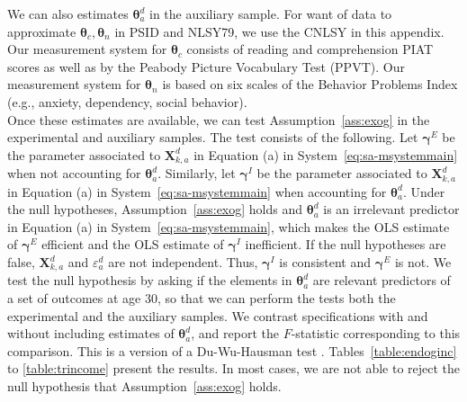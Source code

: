 \noindent We can also estimates $\bm{\theta}_{a}^d$ in the auxiliary sample. For want of data to approximate $\bm{\theta}_{c}, \bm{\theta}_{n}$ in PSID and NLSY79, we use the CNLSY in this appendix. Our measurement system for $\bm{\theta}_{c}$ consists of reading and comprehension PIAT scores as well as by the Peabody Picture Vocabulary Test (PPVT). Our measurement system for $\bm{\theta}_{n}$ is based on six scales of the Behavior Problems Index (e.g., anxiety, dependency, social behavior).\\

\noindent Once these estimates are available, we can test Assumption~\ref{ass:exog} in the experimental and auxiliary samples. The test consists of the following. Let $\bm{\gamma}^E$ be the parameter associated to $\bm{X}^d_{k,a}$ in Equation (a) in System~\eqref{eq:sa-msystemmain} when not accounting for $\bm{\theta}_{a}^d$. Similarly, let $\bm{\gamma}^I$ be the parameter associated to $\bm{X}^d_{k,a}$ in Equation (a) in System~\eqref{eq:sa-msystemmain} when accounting for $\bm{\theta}_{a}^d$. Under the null hypotheses, Assumption~\ref{ass:exog} holds and $\bm{\theta}_{a}^d$ is an irrelevant predictor in Equation (a) in System~\eqref{eq:sa-msystemmain}, which makes the OLS estimate of $\bm{\gamma}^E$ efficient and the OLS estimate of $\bm{\gamma}^I$ inefficient. If the null hypotheses are false, $\bm{X}^d_{k,a}$ and $\varepsilon_{a}^d$ are not independent. Thus, $\bm{\gamma}^I$ is consistent and $\bm{\gamma}^E$ is not. We test the null hypothesis by asking if the elements in $\bm{\theta}_{a}^d$ are relevant predictors of a set of outcomes at age 30, so that we can perform the tests both the experimental and the auxiliary samples. We contrast specifications with and without including estimates of $\bm{\theta}_{a}^d$, and report the $F$-statistic corresponding to this comparison. This is a version of a Du-Wu-Hausman test \citep[see][]{Durbin_1954_RISI,Wu_1973_Econometrica,Hausman_1978_Econometrica}. Tables~\ref{table:endoginc} to \ref{table:trincome} present the results. In most cases, we are not able to reject the null hypothesis that Assumption~\ref{ass:exog} holds. 


